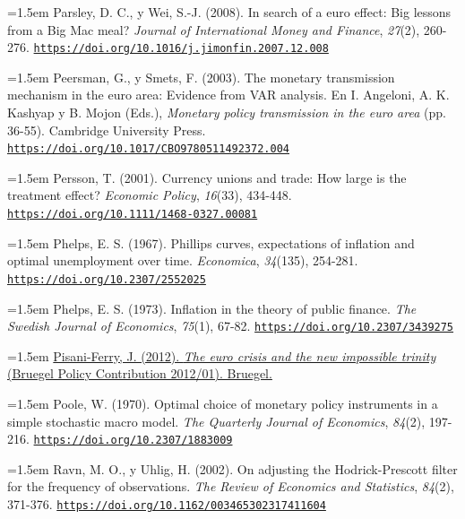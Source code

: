 \documentclass[10pt,a4paper]{article}
\begin{document}
\noindent\hangindent=1.5em Parsley, D. C., y Wei, S.-J. (2008). In search of a euro effect: Big lessons from a Big Mac meal? \textit{Journal of International Money and Finance}, \textit{27}(2), 260-276. \href{https://doi.org/10.1016/j.jimonfin.2007.12.008}{\nolinkurl{https://doi.org/10.1016/j.jimonfin.2007.12.008}}

\noindent\hangindent=1.5em Peersman, G., y Smets, F. (2003). The monetary transmission mechanism in the euro area: Evidence from VAR analysis. En I. Angeloni, A. K. Kashyap y B. Mojon (Eds.), \textit{Monetary policy transmission in the euro area} (pp. 36-55). Cambridge University Press. \href{https://doi.org/10.1017/CBO9780511492372.004}{\nolinkurl{https://doi.org/10.1017/CBO9780511492372.004}}

\noindent\hangindent=1.5em Persson, T. (2001). Currency unions and trade: How large is the treatment effect? \textit{Economic Policy}, \textit{16}(33), 434-448. \href{https://doi.org/10.1111/1468-0327.00081}{\nolinkurl{https://doi.org/10.1111/1468-0327.00081}}

\noindent\hangindent=1.5em Phelps, E. S. (1967). Phillips curves, expectations of inflation and optimal unemployment over time. \textit{Economica}, \textit{34}(135), 254-281. \href{https://doi.org/10.2307/2552025}{\nolinkurl{https://doi.org/10.2307/2552025}}

\noindent\hangindent=1.5em Phelps, E. S. (1973). Inflation in the theory of public finance. \textit{The Swedish Journal of Economics}, \textit{75}(1), 67-82. \href{https://doi.org/10.2307/3439275}{\nolinkurl{https://doi.org/10.2307/3439275}}

\noindent\hangindent=1.5em \href{https://www.bruegel.org/policy-brief/euro-crisis-and-new-impossible-trinity}{Pisani-Ferry, J. (2012). \textit{The euro crisis and the new impossible trinity} (Bruegel Policy Contribution 2012/01). Bruegel.}

\noindent\hangindent=1.5em Poole, W. (1970). Optimal choice of monetary policy instruments in a simple stochastic macro model. \textit{The Quarterly Journal of Economics}, \textit{84}(2), 197-216. \href{https://doi.org/10.2307/1883009}{\nolinkurl{https://doi.org/10.2307/1883009}}

\noindent\hangindent=1.5em Ravn, M. O., y Uhlig, H. (2002). On adjusting the Hodrick-Prescott filter for the frequency of observations. \textit{The Review of Economics and Statistics}, \textit{84}(2), 371-376. \href{https://doi.org/10.1162/003465302317411604}{\nolinkurl{https://doi.org/10.1162/003465302317411604}}
\end{document}
